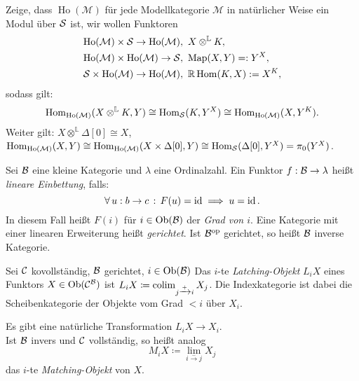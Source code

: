 \documentclass{cheat-sheet}
\newcommand{\ModC}{\mathcal{M}} %
\DeclareMathOperator{\Ho}{Ho} %
\newcommand{\LL}{\mathbb{L}} %
\newcommand{\RD}[1]{\mathbb{R} #1} %
\begin{document}
\begin{ziel}
  Zeige, dass $\Ho(\ModC)$ für jede Modellkategorie $\ModC$ in natürlicher Weise ein Modul über $\mathcal{S}$ ist, \dh{} wir wollen Funktoren
  \begin{align*}
    \Ho(\ModC) \times \Sat \to \Ho(\ModC), \enspace & X \otimes^\LL K, \\
    \Ho(\ModC) \times \Ho(\ModC) \to \Sat, \enspace & \text{Map}(X, Y) =: Y^X, \\
    \Sat \times \Ho(\ModC) \to \Ho(\ModC), \enspace & \RD{\Hom(K, X)} := X^K,
  \end{align*}
  sodass gilt:
  \[ \Hom_{\Ho(\ModC)}(X \otimes^\LL K, Y) \cong \Hom_\Sat(K, Y^X) \cong \Hom_{\Ho(\ModC)}(X, Y^K). \]
  Weiter gilt: $X \otimes^\LL \Delta[0] \cong X$, \dh{} $\Hom_{\Ho(\ModC)}(X, Y) \cong \Hom_{\Ho(\ModC)}(X \times \Delta[0], Y) \cong \Hom_\Sat(\Delta[0], Y^X) = \pi_0(Y^X)$.
\end{ziel}


\begin{defn}
  Sei $\mathcal{B}$ eine kleine Kategorie und $\lambda$ eine Ordinalzahl.
  Ein Funktor $f : \mathcal{B} \to \lambda$ heißt \emph{lineare Einbettung}, falls:
  \[ \forall \, {u : b \to c} \,:\, F(u) = \operatorname{id} \implies u = \operatorname{id}. \]
  In diesem Fall heißt $F(i)$ für $i \in \operatorname{Ob}(\mathcal{B})$ der \emph{Grad von $i$}.
  Eine Kategorie mit einer linearen Erweiterung heißt \emph{gerichtet}.
  Ist $\mathcal{B}^{\mathrm{op}}$ gerichtet, so heißt $\mathcal{B}$ inverse Kategorie.
\end{defn}

\begin{defn}
  Sei $\mathcal{C}$ kovollständig, $\mathcal{B}$ gerichtet, $i \in \operatorname{Ob}(\mathcal{B})$
  Das $i$-te \emph{Latching-Objekt} $L_i X$ eines Funktors $X \in \operatorname{Ob}(\mathcal{C}^{\mathcal{B}})$ ist $L_i X \coloneqq \operatorname{colim}_{j \xrightarrow{{+}} i} X_j$.
  Die Indexkategorie ist dabei die Scheibenkategorie der Objekte vom Grad $< i$ über $X_i$.
\end{defn}

\begin{bem}
  Es gibt eine natürliche Transformation $L_i X \to X_i$. \\
  Ist $\mathcal{B}$ invers und $\mathcal{C}$ vollständig, so heißt analog
  \[ M_i X \coloneqq \lim_{i \xrightarrow{{-}} j} X_j \]
  das $i$-te \emph{Matching-Objekt} von $X$.
\end{bem}

\end{document}
